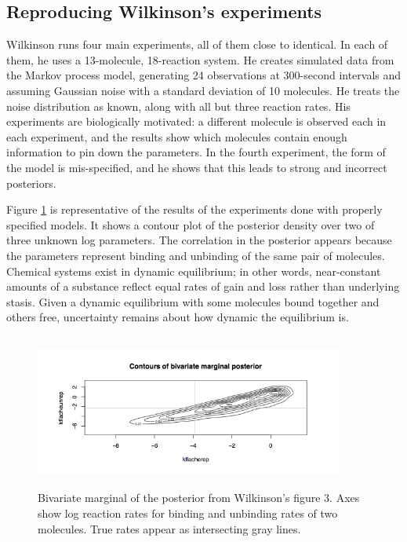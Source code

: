 \documentclass{article}
\begin{document}
\subsection{Reproducing Wilkinson's experiments}

Wilkinson runs four main experiments, all of them close to identical. In each of them, he uses a 13-molecule, 18-reaction system. He creates simulated data from the Markov process model, generating 24 observations at 300-second intervals and assuming Gaussian noise with a standard deviation of 10 molecules. He treats the noise distribution as known, along with all but three reaction rates. His experiments are biologically motivated: a different molecule is observed each in each experiment, and the results show which molecules contain enough information to pin down the parameters. In the fourth experiment, the form of the model is mis-specified, and he shows that this leads to strong and incorrect posteriors.

Figure \ref{fig:wilk_fig_3} is representative of the results of the experiments done with properly specified models. It shows a contour plot of the posterior density over two of three unknown log parameters. The correlation in the posterior appears because the parameters represent binding and unbinding of the same pair of molecules. Chemical systems exist in dynamic equilibrium; in other words, near-constant amounts of a substance reflect equal rates of gain and loss rather than underlying stasis. Given a dynamic equilibrium with some molecules bound together and others free, uncertainty remains about how dynamic the equilibrium is.

\begin{figure}[h!]
\begin{center}
\includegraphics[height=2in,width=4in]{wilkinson_fig3_biv.png}
\caption{ \label{fig:wilk_fig_3} Bivariate marginal of the posterior from Wilkinson's figure 3. Axes show log reaction rates for binding and unbinding rates of two molecules. True rates appear as intersecting gray lines.}
\end{center}
\end{figure}
\end{document}
